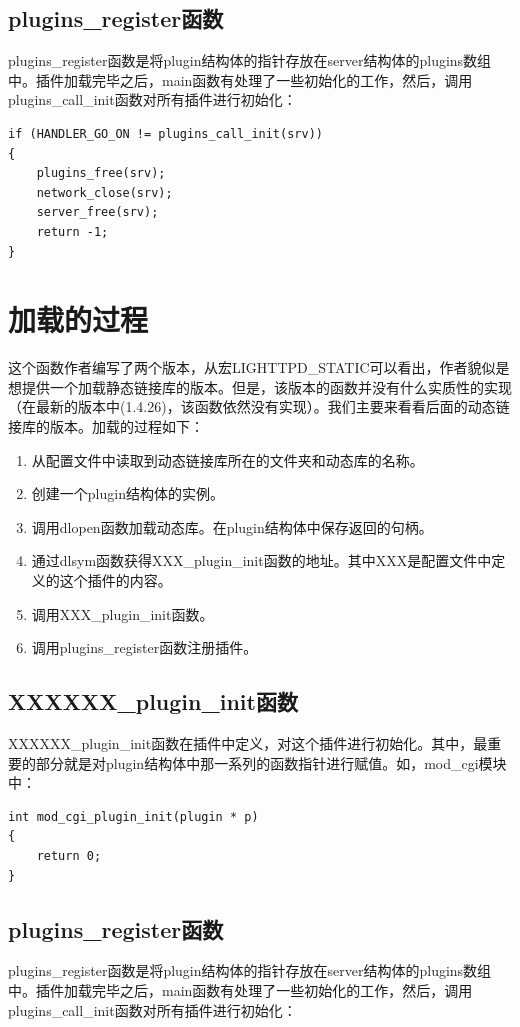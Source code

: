 \documentclass[dvipdfm]{book}
\begin{document}
\subsection{plugins\_register函数}
plugins\_register函数是将plugin结构体的指针存放在server结构体的plugins数组中。插件加载完毕之后，main函数有处理了一些初始化的工作，然后，调用plugins\_call\_init函数对所有插件进行初始化：

\begin{verbatim}
if (HANDLER_GO_ON != plugins_call_init(srv)) 
{
	plugins_free(srv);
	network_close(srv);
	server_free(srv);
	return -1;
}
\end{verbatim}

\section{加载的过程}
这个函数作者编写了两个版本，从宏LIGHTTPD\_STATIC可以看出，作者貌似是想提供一个加载静态链接库的版本。但是，该版本的函数并没有什么实质性的实现（在最新的版本中(1.4.26)，该函数依然没有实现）。我们主要来看看后面的动态链接库的版本。加载的过程如下：
\begin{enumerate}
	\item 从配置文件中读取到动态链接库所在的文件夹和动态库的名称。
	\item 创建一个plugin结构体的实例。
	\item 调用dlopen函数加载动态库。在plugin结构体中保存返回的句柄。
	\item 通过dlsym函数获得XXX\_plugin\_init函数的地址。其中XXX是配置文件中定义的这个插件的内容。
	\item 调用XXX\_plugin\_init函数。
	\item 调用plugins\_register函数注册插件。
\end{enumerate}

\subsection{XXXXXX\_plugin\_init函数}
XXXXXX\_plugin\_init函数在插件中定义，对这个插件进行初始化。其中，最重要的部分就是对plugin结构体中那一系列的函数指针进行赋值。如，mod\_cgi模块中：

\begin{verbatim}
int mod_cgi_plugin_init(plugin * p)
{
	return 0;
}
\end{verbatim}


\subsection{plugins\_register函数}
plugins\_register函数是将plugin结构体的指针存放在server结构体的plugins数组中。插件加载完毕之后，main函数有处理了一些初始化的工作，然后，调用plugins\_call\_init函数对所有插件进行初始化：
\end{document}
